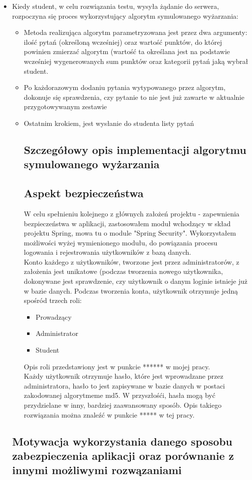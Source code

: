 \documentclass[a4paper, titlepage]{article}
\begin{document}
\begin{itemize}
	\item Kiedy student, w celu rozwiązania testu, wysyła żądanie do serwera, rozpoczyna się proces wykorzystujący algorytm symulowanego wyżarzania:
		\begin{itemize}
		\item Metoda realizująca algorytm parametryzowana jest przez dwa argumenty: ilość pytań (określoną wcześniej) oraz wartość punktów, do której powinien zmierzać algorytm (wartość ta określana jest na podstawie wcześniej wygenerowanych sum punktów oraz kategorii pytań jaką wybrał student.
		\item Po każdorazowym dodaniu pytania wytypowanego przez algorytm, dokonuje się sprawdzenia, czy pytanie to nie jest już zawarte w aktualnie przygotowywanym zestawie
		\item Ostatnim krokiem, jest wysłanie do studenta listy pytań
        \subsection{Szczegółowy opis implementacji algorytmu symulowanego wyżarzania}
        \subsection{Aspekt bezpieczeństwa}
        W celu spełnieniu kolejnego z głównych założeń projektu - zapewnienia bezpieczeństwa w aplikacji, zastosowałem moduł wchodzący w skład projektu Spring, mowa tu o module "Spring Security". Wykorzystałem możliwości wyżej wymienionego modułu, do powiązania procesu logowania i rejestrowania użytkowników z bazą danych. 
        \\ Konto każdego z użytkowników, tworzone jest przez administratorów, z założenia jest unikatowe (podczas tworzenia nowego użytkownika, dokonywane jest sprawdzenie, czy użytkownik o danym loginie istnieje już w bazie danych. Podczas tworzenia konta, użytkownik otrzymuje jedną spośród trzech roli:
        \begin{itemize}
        \item Prowadzący
        \item Administrator
        \item Student
        \end{itemize}
        Opis roli przedstawiony jest w punkcie ****** w mojej pracy.
        \\ Każdy użytkownik otrzymuje hasło, które jest wprowadzane przez administratora, hasło to jest zapisywane w bazie danych w postaci zakodowanej algorytmeme md5. W przyszłośći, hasła mogą być przydzielane w inny, bardziej zaawansowany sposób. Opis takiego rozwiązania można znaleźć w punkcie ***** w tej pracy.
		\end{itemize}
        
        \subsection{Motywacja wykorzystania danego sposobu zabezpieczenia aplikacji oraz porównanie z innymi możliwymi rozwązaniami}
	\end{itemize}
    
\end{document}
